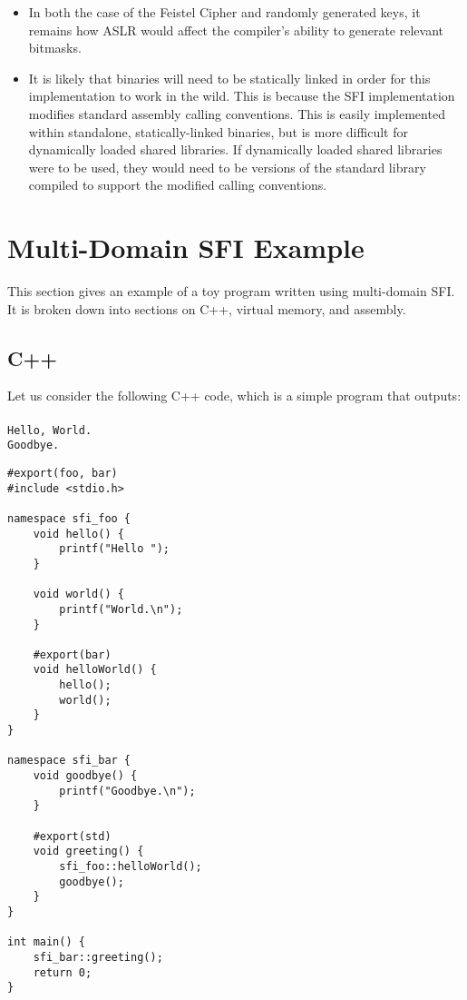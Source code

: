 \documentclass[12pt]{article}
\begin{document}
\begin{itemize}
	\item In both the case of the Feistel Cipher and randomly generated keys, it remains how ASLR would affect the compiler’s ability to generate relevant bitmasks.

	\item It is likely that binaries will need to be statically linked in order for this implementation to work in the wild. This is because the SFI implementation modifies standard assembly calling conventions. This is easily implemented within standalone, statically-linked binaries, but is more difficult for dynamically loaded shared libraries. If dynamically loaded shared libraries were to be used, they would need to be versions of the standard library compiled to support the modified calling conventions.
\end{itemize}

\section{Multi-Domain SFI Example}

This section gives an example of a toy program written using multi-domain SFI. It is broken down into sections on C++, virtual memory, and assembly.

\subsection{C++}

Let us consider the following C++ code, which is a simple program that outputs:\\ \\
\texttt{Hello, World.\\Goodbye.}

\begin{verbatim}
#export(foo, bar)
#include <stdio.h>

namespace sfi_foo {
	void hello() {
		printf("Hello ");
	}
	
	void world() {
		printf("World.\n");
	}
	
	#export(bar)
	void helloWorld() {
		hello();
		world();
	}
}

namespace sfi_bar {
	void goodbye() {
		printf("Goodbye.\n");
	}
	
	#export(std)
	void greeting() {
		sfi_foo::helloWorld();
		goodbye();
	}
}

int main() {
	sfi_bar::greeting();
	return 0;
}

\end{verbatim}
\end{document}
